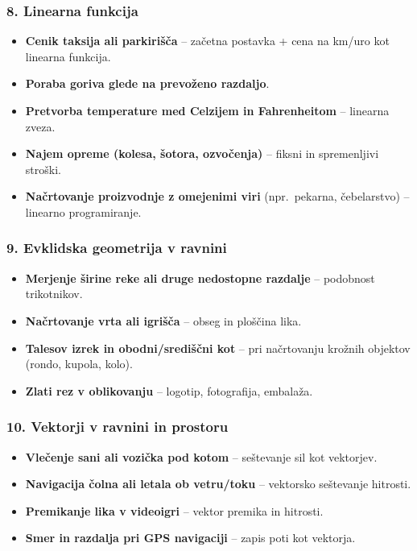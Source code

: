 \documentclass[11pt,a4paper]{article}
\begin{document}
\subsubsection*{8. Linearna funkcija}
\begin{itemize}
  \item \textbf{Cenik taksija ali parkirišča} -- začetna postavka + cena na km/uro kot linearna funkcija.
  \item \textbf{Poraba goriva glede na prevoženo razdaljo}.
  \item \textbf{Pretvorba temperature med Celzijem in Fahrenheitom} -- linearna zveza.
  \item \textbf{Najem opreme (kolesa, šotora, ozvočenja)} -- fiksni in spremenljivi stroški.
  \item \textbf{Načrtovanje proizvodnje z omejenimi viri} (npr.\ pekarna, čebelarstvo) -- linearno programiranje.
\end{itemize}

\subsubsection*{9. Evklidska geometrija v ravnini}
\begin{itemize}
  \item \textbf{Merjenje širine reke ali druge nedostopne razdalje} -- podobnost trikotnikov.
  \item \textbf{Načrtovanje vrta ali igrišča} -- obseg in ploščina lika.
  \item \textbf{Talesov izrek in obodni/središčni kot} -- pri načrtovanju krožnih objektov (rondo, kupola, kolo).
  \item \textbf{Zlati rez v oblikovanju} -- logotip, fotografija, embalaža.
\end{itemize}

\subsubsection*{10. Vektorji v ravnini in prostoru}
\begin{itemize}
  \item \textbf{Vlečenje sani ali vozička pod kotom} -- seštevanje sil kot vektorjev.
  \item \textbf{Navigacija čolna ali letala ob vetru/toku} -- vektorsko seštevanje hitrosti.
  \item \textbf{Premikanje lika v videoigri} -- vektor premika in hitrosti.
  \item \textbf{Smer in razdalja pri GPS navigaciji} -- zapis poti kot vektorja.
\end{itemize}
\end{document}
